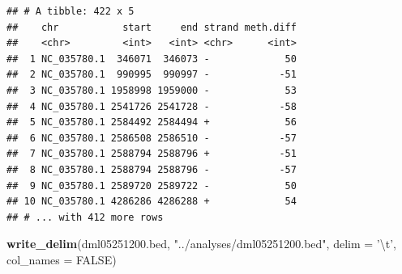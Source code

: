 \documentclass[]{article}
\newenvironment{Shaded}{\begin{snugshade}}{\end{snugshade}}
\newcommand{\KeywordTok}[1]{\textcolor[rgb]{0.13,0.29,0.53}{\textbf{#1}}}
\newcommand{\DataTypeTok}[1]{\textcolor[rgb]{0.13,0.29,0.53}{#1}}
\newcommand{\CharTok}[1]{\textcolor[rgb]{0.31,0.60,0.02}{#1}}
\newcommand{\StringTok}[1]{\textcolor[rgb]{0.31,0.60,0.02}{#1}}
\newcommand{\OtherTok}[1]{\textcolor[rgb]{0.56,0.35,0.01}{#1}}
\newcommand{\NormalTok}[1]{#1}
\begin{document}
\begin{verbatim}
## # A tibble: 422 x 5
##    chr           start     end strand meth.diff
##    <chr>         <int>   <int> <chr>      <int>
##  1 NC_035780.1  346071  346073 -             50
##  2 NC_035780.1  990995  990997 -            -51
##  3 NC_035780.1 1958998 1959000 -             53
##  4 NC_035780.1 2541726 2541728 -            -58
##  5 NC_035780.1 2584492 2584494 +             56
##  6 NC_035780.1 2586508 2586510 -            -57
##  7 NC_035780.1 2588794 2588796 +            -51
##  8 NC_035780.1 2588794 2588796 -            -57
##  9 NC_035780.1 2589720 2589722 -             50
## 10 NC_035780.1 4286286 4286288 +             54
## # ... with 412 more rows
\end{verbatim}

\begin{Shaded}
\begin{Highlighting}[]
\KeywordTok{write_delim}\NormalTok{(dml05251200.bed, }\StringTok{"../analyses/dml05251200.bed"}\NormalTok{,  }\DataTypeTok{delim =} \StringTok{'}\CharTok{\textbackslash{}t}\StringTok{'}\NormalTok{, }\DataTypeTok{col_names =} \OtherTok{FALSE}\NormalTok{)}
\end{Highlighting}
\end{Shaded}
\end{document}
